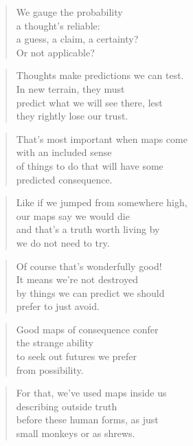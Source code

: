 \documentclass[10pt,a4paper]{article}
\begin{document}
\begin{paracol}{2}
\begin{verse}
We gauge the probability\\
a thought’s reliable:\\
a guess, a claim, a certainty?\\
Or not applicable?
\end{verse}

\begin{verse}
Thoughts make predictions we can test.\\
In new terrain, they must\\
predict what we will see there, lest\\
they rightly lose our trust.
\end{verse}

\begin{verse}
That’s most important when maps come\\
with an included sense\\
of things to do that will have some\\
predicted consequence.
\end{verse}

\begin{verse}
Like if we jumped from somewhere high,\\
our maps say we would die\\
and that’s a truth worth living by\\
we do not need to try.
\end{verse}

\begin{verse}
Of course that’s wonderfully good!\\
It means we’re not destroyed\\
by things we can predict we should\\
prefer to just avoid.
\end{verse}

\begin{verse}
Good maps of consequence confer\\
the strange ability\\
to seek out futures we prefer\\
from possibility.
\end{verse}

\begin{verse}
For that, we’ve used maps inside us\\
describing outside truth\\
before these human forms, as just\\
small monkeys or as shrews.
\end{verse}


\end{paracol}
\end{document}

